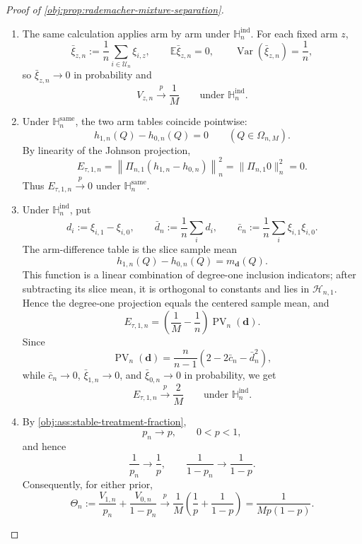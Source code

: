 \begin{proof}[Proof of \cref{obj:prop:rademacher-mixture-separation}]
\begin{enumerate}
\item The same calculation applies arm by arm under \(\mathbb H_n^{\mathrm{ind}}\).  For each fixed arm \(z\),
\[
\bar\xi_{z,n}:=\frac1n\sum_{i\in\mathcal U_n}\xi_{i,z},
\qquad
\mathbb E\bar\xi_{z,n}=0,
\qquad
\operatorname{Var}(\bar\xi_{z,n})=\frac1n,
\]
so \(\bar\xi_{z,n}\to0\) in probability and
\[
V_{z,n}\stackrel{p}{\longrightarrow}\frac1M
\qquad
\text{under }\mathbb H_n^{\mathrm{ind}}.
\]

\item Under \(\mathbb H_n^{\mathrm{same}}\), the two arm tables coincide pointwise:
\[
h_{1,n}(Q)-h_{0,n}(Q)=0
\qquad
(Q\in\Omega_{n,M}).
\]
By linearity of the Johnson projection,
\[
E_{\tau,1,n}
=
\left\|\Pi_{n,1}(h_{1,n}-h_{0,n})\right\|_n^2
=
\|\Pi_{n,1}0\|_n^2
=
0.
\]
Thus \(E_{\tau,1,n}\stackrel{p}{\to}0\) under \(\mathbb H_n^{\mathrm{same}}\).

\item Under \(\mathbb H_n^{\mathrm{ind}}\), put
\[
d_i:=\xi_{i,1}-\xi_{i,0},
\qquad
\bar d_n:=\frac1n\sum_i d_i,
\qquad
\bar c_n:=\frac1n\sum_i \xi_{i,1}\xi_{i,0}.
\]
The arm-difference table is the slice sample mean
\[
h_{1,n}(Q)-h_{0,n}(Q)=m_{\boldsymbol d}(Q).
\]
This function is a linear combination of degree-one inclusion indicators; after subtracting its slice mean, it is orthogonal to constants and lies in \(\mathcal H_{n,1}\).  Hence the degree-one projection equals the centered sample mean, and
\[
E_{\tau,1,n}
=
\left(\frac1M-\frac1n\right)\operatorname{PV}_n(\boldsymbol d).
\]
Since
\[
\operatorname{PV}_n(\boldsymbol d)
=
\frac n{n-1}
\left(2-2\bar c_n-\bar d_n^2\right),
\]
while \(\bar c_n\to0\), \(\bar\xi_{1,n}\to0\), and \(\bar\xi_{0,n}\to0\) in probability, we get
\[
E_{\tau,1,n}\stackrel{p}{\longrightarrow}\frac2M
\qquad
\text{under }\mathbb H_n^{\mathrm{ind}}.
\]

\item By \cref{obj:ass:stable-treatment-fraction},
\[
p_n\to p,\qquad 0<p<1,
\]
and hence
\[
\frac1{p_n}\to\frac1p,
\qquad
\frac1{1-p_n}\to\frac1{1-p}.
\]
Consequently, for either prior,
\[
\Theta_n:=
\frac{V_{1,n}}{p_n}+\frac{V_{0,n}}{1-p_n}
\stackrel{p}{\longrightarrow}
\frac1M\left(\frac1p+\frac1{1-p}\right)
=
\frac1{M p(1-p)}.
\]


\end{enumerate}
\end{proof}
